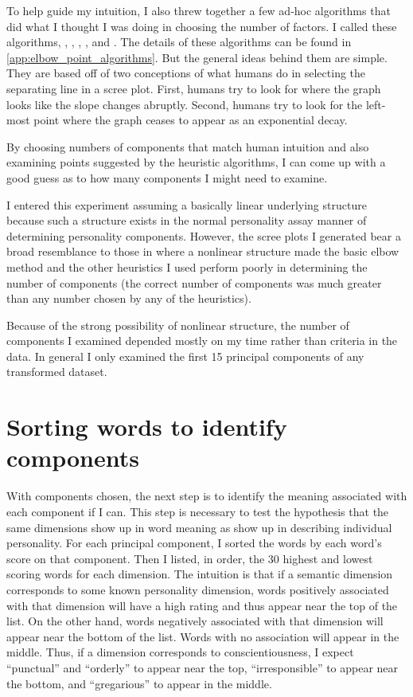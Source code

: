\documentclass[eric_thesis.tex]{subfiles}
\begin{document}
To help guide my intuition, I also threw together a few ad-hoc algorithms that 
did what I thought I was doing in choosing the number of factors. I called 
these algorithms, , , 
, , and 
. The details of these algorithms can 
be found in \ref{app:elbow_point_algorithms}. But the general ideas behind them 
are simple. They are based off of two conceptions of what humans do in selecting 
the separating line in a scree plot. First, humans try to look for where the 
graph looks like the slope changes abruptly. Second, humans try to look for the 
left-most point where the graph ceases to appear as an exponential decay.

By choosing numbers of components that match human intuition and also
examining points suggested by the heuristic algorithms, I can come up
with a good guess as to how many components I might need to examine.

I entered this experiment assuming a basically linear underlying
structure because such a structure exists in the normal personality
assay manner of determining personality components. However, the scree
plots I generated bear a broad resemblance to those in  where a nonlinear structure
made the basic elbow method and the other heuristics I used perform
poorly in determining the number of components (the correct number of
components was much greater than any number chosen by any of the
heuristics).

Because of the strong possibility of nonlinear structure, the number
of components I examined depended mostly on my time rather than
criteria in the data. In general I only examined the first 15
principal components of any transformed dataset.

\section{Sorting words to identify components}

With components chosen, the next 
step is to identify the meaning associated with each component if I can. This 
step is necessary to test the hypothesis that the same dimensions show up in 
word meaning as show up in describing individual personality. For each 
principal 
component, I sorted the words by each word's score on that component. Then I 
listed, in order, the 30 highest and lowest scoring words for each dimension. 
The intuition is that if a semantic dimension corresponds to some known 
personality dimension, words positively associated with that dimension will 
have 
a high rating and thus appear near the top of the list. On the other hand, 
words 
negatively associated with that dimension will appear near the bottom of the 
list. Words with no association will appear in the middle. Thus, if a dimension 
corresponds to conscientiousness, I expect ``punctual'' and ``orderly'' to 
appear near the top, ``irresponsible'' to appear near the bottom, and ``gregarious''
to appear in the middle.
\end{document}
